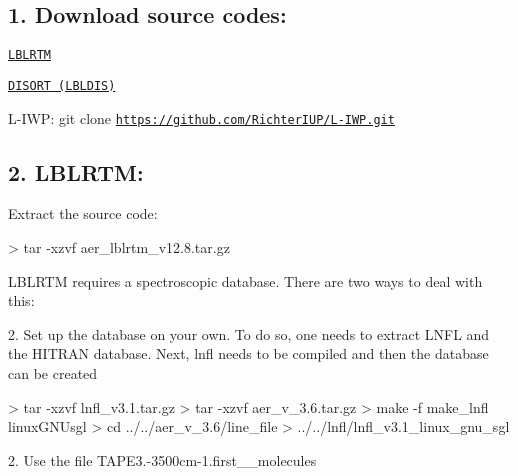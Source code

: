 \subsection*{1. Download source codes\+:}


\begin{DoxyItemize}
\item \href{http://rtweb.aer.com/lblrtm.html}{\tt L\+B\+L\+R\+TM}
\item \href{https://www.nssl.noaa.gov/users/dturner/public_html/lbldis/index.html}{\tt D\+I\+S\+O\+RT (L\+B\+L\+D\+IS)}
\item L-\/\+I\+WP\+: git clone \href{https://github.com/RichterIUP/L-IWP.git}{\tt https\+://github.\+com/\+Richter\+I\+U\+P/\+L-\/\+I\+W\+P.\+git}
\end{DoxyItemize}

\subsection*{2. L\+B\+L\+R\+TM\+:}


\begin{DoxyItemize}
\item Extract the source code\+: 
\begin{DoxyCode}
> tar -xzvf aer\_lblrtm\_v12.8.tar.gz
\end{DoxyCode}

\end{DoxyItemize}

L\+B\+L\+R\+TM requires a spectroscopic database. There are two ways to deal with this\+:

2. Set up the database on your own. To do so, one needs to extract L\+N\+FL and the H\+I\+T\+R\+AN database. Next, lnfl needs to be compiled and then the database can be created 
\begin{DoxyCode}
> tar -xzvf lnfl\_v3.1.tar.gz
> tar -xzvf aer\_v\_3.6.tar.gz 
> make -f make\_lnfl linuxGNUsgl
> cd ../../aer\_v\_3.6/line\_file
> ../../lnfl/lnfl\_v3.1\_linux\_gnu\_sgl
\end{DoxyCode}


2. Use the file T\+A\+P\+E3.-\/3500cm-\/1.\+first\+\_\+\_\+molecules


